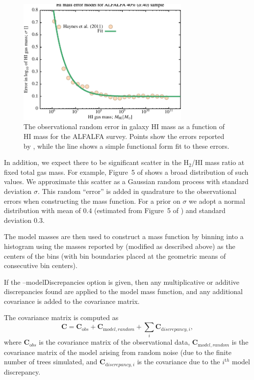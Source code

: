 \begin{figure}
 \begin{center}
 \includegraphics[width=85mm,trim=0mm 0mm 0mm 4mm,clip]{Plots/DataAnalysis/alfalfaHIMassErrorModel.pdf}
 \caption{The observational random error in galaxy HI mass as a function of HI mass for the ALFALFA survey. Points show the errors reported by \protect\cite{haynes_arecibo_2011}, while the line shows a simple functional form fit to these errors.}
 \end{center}
 \label{fig:ALFALFAErrorModel}
\end{figure}

In addition, we expect there to be significant scatter in the H$_2$/HI mass ratio at fixed total gas mass. For example, Figure~5 of \cite{power_redshift_2010} shows a broad distribution of such values. We approximate this scatter as a Gaussian random process with standard deviation $\sigma$. This random ``error'' is added in quadrature to the observational errors when constructing the mass function. For a prior on $\sigma$ we adopt a normal distribution with mean of $0.4$ (estimated from Figure~5 of \cite{power_redshift_2010}) and standard deviation $0.3$.

The model masses are then used to construct a mass function by binning into a histogram using the masses reported by \cite{martin_arecibo_2010} (modified as described above) as the centers of the bins (with bin boundaries placed at the geometric means of consecutive bin centers).

If the {\normalfont \ttfamily --modelDiscrepancies} option is given, then any multiplicative or additive discrepancies found are applied to the model mass function, and any additional covariance is added to the covariance matrix.

The covariance matrix is computed as
\begin{equation}
 {\mathbf C} = {\mathbf C}_{\mathrm obs} + {\mathbf C}_{\mathrm model,random} + \sum_i {\mathbf C}_{{\mathrm discrepancy}, i},
\end{equation}
where ${\mathbf C}_{\mathrm obs}$ is the covariance matrix of the observational data, ${\mathbf C}_{\mathrm model,random}$ is the covariance matrix of the model arising from random noise (due to the finite number of trees simulated, and ${\mathbf C}_{{\mathrm discrepancy}, i}$ is the covariance due to the $i^{\mathrm th}$ model discrepancy.

